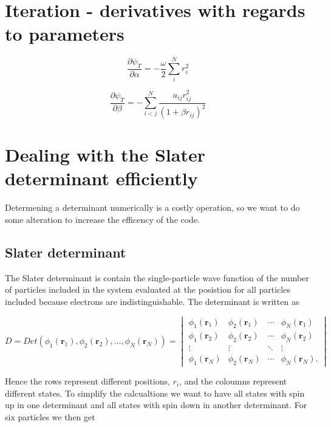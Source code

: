 \section{Iteration - derivatives with regards to parameters}

\begin{equation}
\frac{\partial \psi_T}{\partial \alpha} = -\frac{\omega}{2}\sum_i^N r_i^2
\end{equation}

\begin{equation}
\frac{\partial \psi_T}{\partial \beta} = - \sum_{i<j}^N \frac{a_{ij}r_{ij}^2}{(1+\beta r_{ij})^2}
\end{equation}

\section{Dealing with the Slater determinant efficiently}

Determening a determinant numerically is a costly operation, so we want to do some alteration to increase the efficency of the code.

\subsection{Slater determinant}\label{app:efficient_SD}

The Slater determinant is contain the single-particle wave function of the number of particles included in the system evaluated at the posistion for all particles included because electrons are indistinguishable. The determinant is written as

$$ D = Det\left(\phi_{1}(\bm{r}_1),\phi_{2}(\bm{r}_2),
   \dots,\phi_{N}(\bm{r}_N)\right) =  \begin{vmatrix}
  \phi_{1}(\bm{r}_1) & \phi_{2}(\bm{r}_1) & \cdots & \phi_{N}(\bm{r}_1) \\
  \phi_{1}(\bm{r}_2) & \phi_{2}(\bm{r}_2) & \cdots & \phi_{N}(\bm{r}_2) \\
  \vdots  & \vdots  & \ddots & \vdots  \\
  \phi_{1}(\bm{r}_N) & \phi_{2}(\bm{r}_N) & \cdots & \phi_{N}(\bm{r}_N).
\end{vmatrix}$$

Hence the rows represent different positions, $r_i$, and the coloumns represent different states. To simplify the calcualtions we want to have all states with spin up in one determinant and all states with spin down in another determinant. For six particles we then get

